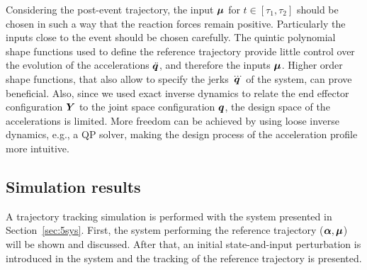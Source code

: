 \documentclass[../DC2019003Bouma.tex]{subfiles}
\begin{document}
Considering the post-event trajectory, the input $\boldsymbol{\mu}$ for $t\in[\tau_1,\tau_2]$ should be chosen in such a way that the reaction forces remain positive. Particularly the inputs close to the event should be chosen carefully. The quintic polynomial shape functions used to define the reference trajectory provide little control over the evolution of the accelerations $\ddot{{\boldsymbol{q}}}$, and therefore the inputs $\boldsymbol{\mu}$. Higher order shape functions, that also allow to specify the jerks $\dddot{{\boldsymbol{q}}}$ of the system, can prove beneficial. Also, since we used exact inverse dynamics to relate the end effector configuration ${\boldsymbol{Y}}$ to the joint space configuration ${\boldsymbol{q}}$, the design space of the accelerations is limited. More freedom can be achieved by using loose inverse dynamics, e.g., a QP solver, making the design process of the acceleration profile more intuitive.

\subsection{Simulation results}
A trajectory tracking simulation is performed with the system presented in Section~\ref{sec:5sys}. First, the system performing the reference trajectory ($\boldsymbol{\alpha},\boldsymbol{\mu}$) will be shown and discussed. After that, an initial state-and-input perturbation is introduced in the system and the tracking of the reference trajectory is presented.
\end{document}
